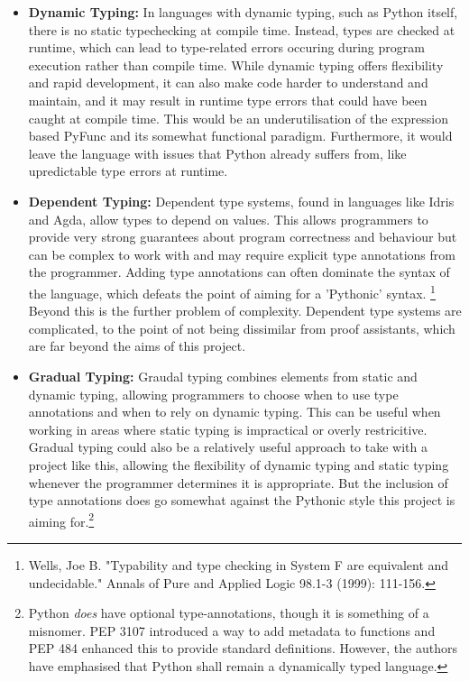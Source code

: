 \documentclass{l4proj}
\begin{document}
\begin{itemize}
    \item \textbf{Dynamic Typing:} In languages with dynamic typing, such as Python itself, there is no static typechecking at compile time.
    Instead, types are checked at runtime, which can lead to type-related errors occuring during program execution rather than compile time. 
    While dynamic typing offers flexibility and rapid development, it can also make code harder to understand and maintain, and it may result in runtime type errors that could have been caught at compile time.
    This would be an underutilisation of the expression based PyFunc and its somewhat functional paradigm.
    Furthermore, it would leave the language with issues that Python already suffers from, like upredictable type errors at runtime.
    \item \textbf{Dependent Typing:} Dependent type systems, found in languages like Idris and Agda, allow types to depend on values.
    This allows programmers to provide very strong guarantees about program correctness and behaviour but can be complex to work with and may require explicit type annotations from the programmer.
    Adding type annotations can often dominate the syntax of the language, which defeats the point of aiming for a 'Pythonic' syntax. \footnote{Wells, Joe B. "Typability and type checking in System F are equivalent and undecidable." Annals of Pure and Applied Logic 98.1-3 (1999): 111-156.}
    Beyond this is the further problem of complexity.
    Dependent type systems are complicated, to the point of not being dissimilar from proof assistants, which are far beyond the aims of this project.
    \item \textbf{Gradual Typing:} Graudal typing combines elements from static and dynamic typing, allowing programmers to choose when to use type annotations and when to rely on dynamic typing.
    This can be useful when working in areas where static typing is impractical or overly restricitive. 
    Gradual typing could also be a relatively useful approach to take with a project like this, allowing the flexibility of dynamic typing and static typing whenever the programmer determines it is appropriate.
    But the inclusion of type annotations does go somewhat against the Pythonic style this project is aiming for.\footnote{Python \emph{does} have optional type-annotations, though it is something of a misnomer.
    PEP 3107 introduced a way to add metadata to functions and PEP 484 enhanced this to provide standard definitions.
    However, the authors have emphasised that Python shall remain a dynamically typed language.}
\end{itemize}
\end{document}
